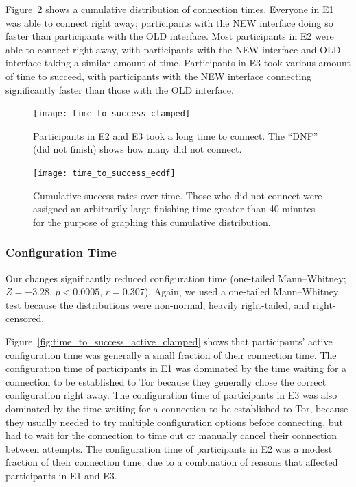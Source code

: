 \documentclass[USenglish,oneside,twocolumn]{article}
\begin{document}
Figure~\ref{fig:time_to_success_ecdf} shows a cumulative distribution of connection times. Everyone in E1 was able to connect right away; participants with the NEW interface doing so faster than participants with the OLD interface. Most participants in E2 were able to connect right away, with participants with the NEW interface and OLD interface taking a similar amount of time. Participants in E3 took various amount of time to succeed, with participants with the NEW interface connecting significantly faster than those with the OLD interface. 

\begin{figure}[t]
\centering
\texttt{[image: time\_to\_success\_clamped]}
\caption{
Participants in E2 and E3 took a long time to connect.
The ``DNF'' (did not finish) shows how many did not connect.}
\label{fig:time_to_success_clamped}
\end{figure}

\begin{figure}[t]
\centering
\texttt{[image: time\_to\_success\_ecdf]}
%
\caption{
Cumulative success rates over time. Those who did not connect were assigned an arbitrarily large finishing time greater than 40 minutes for the purpose of graphing this cumulative distribution. 
}
\label{fig:time_to_success_ecdf}
\end{figure}


\subsubsection{Configuration Time} 
Our changes significantly reduced configuration time (one-tailed Mann--Whitney; $Z = -3.28$, $p < 0.0005$, $r = 0.307$). Again, we used a one-tailed Mann--Whitney test because the distributions were non-normal, heavily right-tailed, and right-censored. 

Figure~\ref{fig:time_to_success_active_clamped} shows that participants' active configuration time was generally a small fraction of their connection time. The configuration time of participants in E1 was dominated by the time waiting for a connection to be established to Tor because they generally chose the correct configuration right away. The configuration time of participants in E3 was also dominated by the time waiting for a connection to be established to Tor, because they usually needed to try multiple configuration options before connecting, but had to wait for the connection to time out or manually cancel their connection between attempts. The configuration time of participants in E2 was a modest fraction of their connection time, due to a combination of reasons that affected participants in E1 and E3. 
\end{document}
